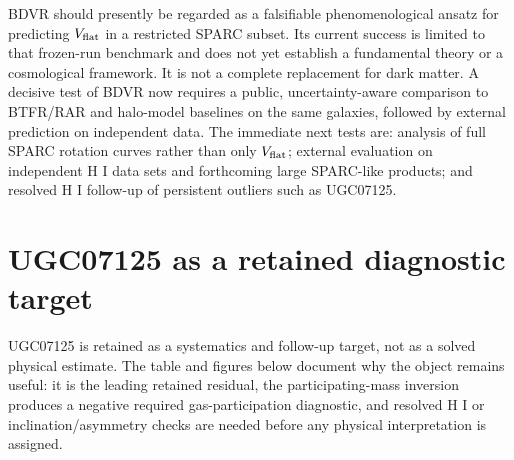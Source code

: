 \documentclass[aps,prd,preprint,nofootinbib,superscriptaddress]{revtex4-2}
\providecommand{\FloatBarrier}{\clearpage}
\begin{document}
BDVR should presently be regarded as a falsifiable phenomenological ansatz for predicting $V_{\rm flat}$ in a restricted SPARC subset. Its current success is limited to that frozen-run benchmark and does not yet establish a fundamental theory or a cosmological framework. It is not a complete replacement for dark matter. A decisive test of BDVR now requires a public, uncertainty-aware comparison to BTFR/RAR and halo-model baselines on the same galaxies, followed by external prediction on independent data. The immediate next tests are: analysis of full SPARC rotation curves rather than only $V_{\rm flat}$; external evaluation on independent H I data sets and forthcoming large SPARC-like products; and resolved H I follow-up of persistent outliers such as UGC07125.

\clearpage
\FloatBarrier
\appendix

\section{UGC07125 as a retained diagnostic target}

UGC07125 is retained as a systematics and follow-up target, not as a solved physical estimate. The table and figures below document why the object remains useful: it is the leading retained residual, the participating-mass inversion produces a negative required gas-participation diagnostic, and resolved H I or inclination/asymmetry checks are needed before any physical interpretation is assigned.
\end{document}
